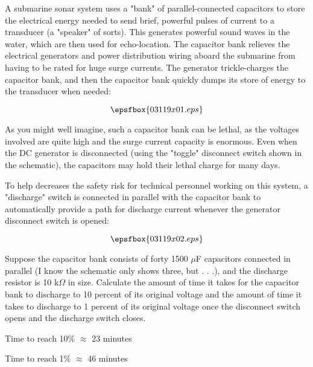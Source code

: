 

A submarine sonar system uses a "bank" of parallel-connected capacitors to store the electrical energy needed to send brief, powerful pulses of current to a transducer (a "speaker" of sorts).  This generates powerful sound waves in the water, which are then used for echo-location.  The capacitor bank relieves the electrical generators and power distribution wiring aboard the submarine from having to be rated for huge surge currents.  The generator trickle-charges the capacitor bank, and then the capacitor bank quickly dumps its store of energy to the transducer when needed:

$$\epsfbox{03119x01.eps}$$

As you might well imagine, such a capacitor bank can be lethal, as the voltages involved are quite high and the surge current capacity is enormous.  Even when the DC generator is disconnected (using the "toggle" disconnect switch shown in the schematic), the capacitors may hold their lethal charge for many days.

To help decreases the safety risk for technical personnel working on this system, a "discharge" switch is connected in parallel with the capacitor bank to automatically provide a path for discharge current whenever the generator disconnect switch is opened:

$$\epsfbox{03119x02.eps}$$

Suppose the capacitor bank consists of forty 1500 $\mu$F capacitors connected in parallel (I know the schematic only shows three, but . . .), and the discharge resistor is 10 k$\Omega$ in size.  Calculate the amount of time it takes for the capacitor bank to discharge to 10 percent of its original voltage and the amount of time it takes to discharge to 1 percent of its original voltage once the disconnect switch opens and the discharge switch closes.







Time to reach 10\% $\approx$ 23 minutes 

\vskip 10pt

Time to reach 1\% $\approx$ 46 minutes

